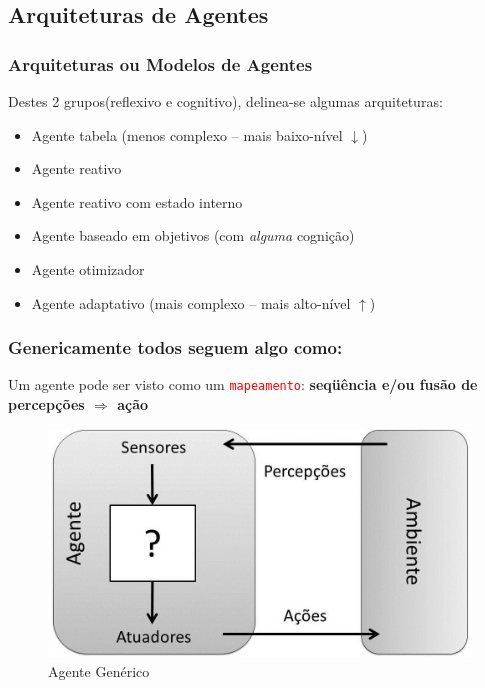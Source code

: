 \subsection{Arquiteturas de Agentes}
\begin{frame} %

\frametitle{Arquiteturas ou Modelos de Agentes}

\begin{block}{Destes 2 grupos(reflexivo e cognitivo), delinea-se algumas arquiteturas:}
  
    \begin{itemize}
      \item Agente tabela (menos complexo -- mais baixo-nível $\downarrow $)
      \item Agente reativo
      \item Agente reativo com estado interno 
      \item Agente baseado em objetivos (com \textit{alguma} cognição)
      \item Agente otimizador
      \item Agente adaptativo (mais complexo -- mais alto-nível $\uparrow $)
    \end{itemize}
  
\end{block}

\end{frame}



\begin{frame} %

    \frametitle{Genericamente todos seguem algo como:}

Um agente pode ser visto como um \textcolor{red}{\texttt{mapeamento}}: 
\textbf{seqüência e/ou fusão de percepções $\Rightarrow$  ação}

\begin{figure}[!ht]
  \centering
  \includegraphics[height =.5\textheight,width=.7\textwidth]{figuras/agente_generico.jpg}
  \caption{Agente Genérico}
\end{figure}
\end{frame}

